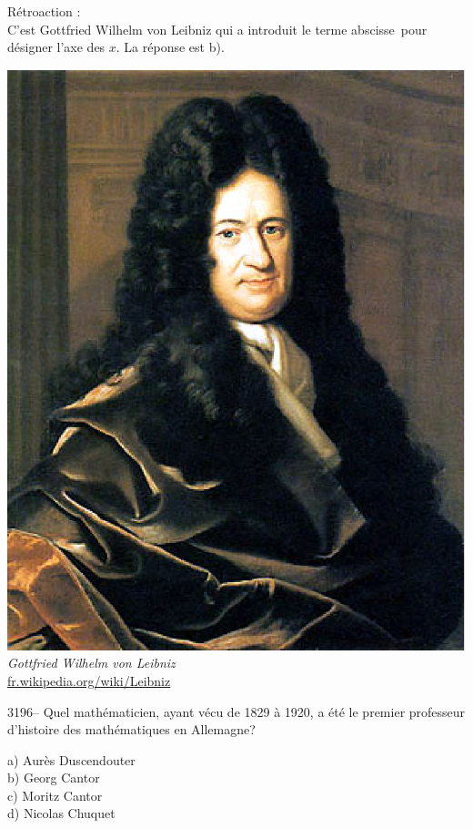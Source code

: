 \documentclass[letterpaper, 12pt]{article}
\begin{document}
R\'etroaction :\\
C'est Gottfried Wilhelm von Leibniz qui a introduit le terme \og abscisse\fg \ pour d\'esigner l'axe des $x$. La r\'eponse est b).
\begin{center}
\includegraphics[scale=0.25]{Leibniz.eps}\\
\emph{{\small Gottfried Wilhelm von Leibniz}}\\
\href{http://fr.wikipedia.org/wiki/Leibniz}{fr.wikipedia.org/wiki/Leibniz}\\[5mm]
\end{center}



3196-- Quel math\'ematicien, ayant v\'ecu de 1829 \`a 1920, a \'et\'e le premier professeur d'histoire des math\'ematiques en Allemagne?

a) Aur\`es Duscendouter\\
b) Georg Cantor\\
c) Moritz Cantor\\
d) Nicolas Chuquet\\
\end{document}
